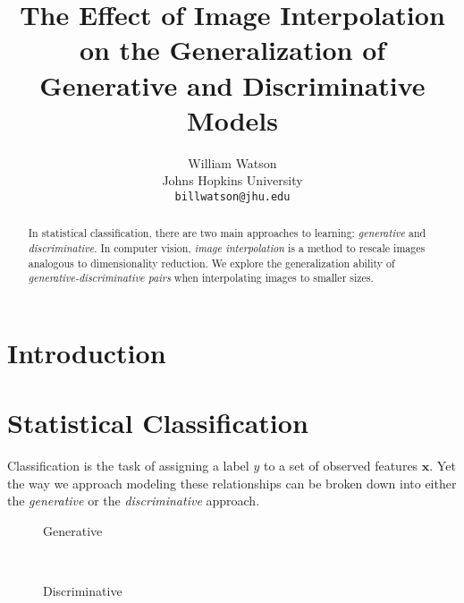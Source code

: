 \documentclass{article}
\title{The Effect of Image Interpolation on the Generalization of Generative and Discriminative Models}
\author{%
  William Watson \\
  Johns Hopkins University\\
  \texttt{billwatson@jhu.edu} \\
}
\begin{document}

\maketitle

\begin{abstract}
  In statistical classification, there are two main approaches to learning:
  \textit{generative} and \textit{discriminative}. In computer vision,
  \textit{image interpolation} is a method to rescale images analogous to
  dimensionality reduction. We explore the generalization ability of
  \textit{generative-discriminative pairs} when interpolating images to smaller
  sizes.
\end{abstract}



\section{Introduction}
\label{sec:intro}


\section{Statistical Classification}
Classification is the task of assigning a label $y$ to a set of observed
features $\mathbf{x}$. Yet the way we approach modeling these relationships
can be broken down into either the \textit{generative} or the
\textit{discriminative} approach.

\begin{figure*}[h!]
    \centering
    \begin{subfigure}[t]{0.15\textwidth}
        \centering
        \caption*{Generative}
    \end{subfigure}%
    ~
    \begin{subfigure}[t]{0.15\textwidth}
        \centering
        \caption*{Discriminative}
    \end{subfigure}
\end{figure*}
\end{document}
